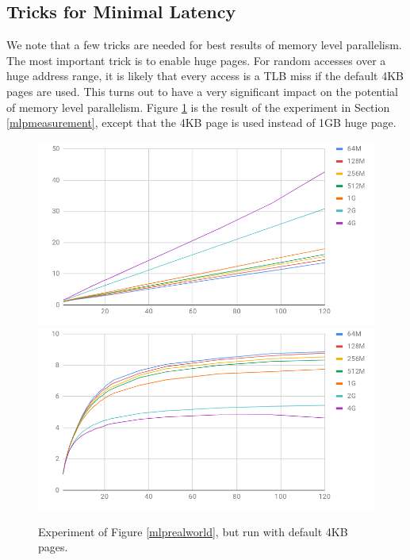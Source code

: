 \documentclass[11pt, usletter]{article}
\begin{document}
\subsection{Tricks for Minimal Latency} \label{misctricks}

We note that a few tricks are needed for best results of memory level parallelism. 
The most important trick is to enable huge pages. 
For random accesses over a huge address range, 
it is likely that every access is a TLB miss if the default 4KB pages are used. 
This turns out to have a very significant impact on the potential of memory level parallelism. 
Figure \ref{mlp_4kb} is the result of the experiment in Section \ref{mlpmeasurement}, 
except that the 4KB page is used instead of 1GB huge page. 

\begin{figure}[!htb]
  \includegraphics[width=\linewidth]{equivalentCost_4k.png}
\endminipage\hfill
{}
  \includegraphics[width=\linewidth]{equivalentMLP_4k.png}
\endminipage\hfill
\caption{Experiment of Figure \ref{mlprealworld}, but run with default 4KB pages.}
\label{mlp_4kb}
\end{figure}
\end{document}
